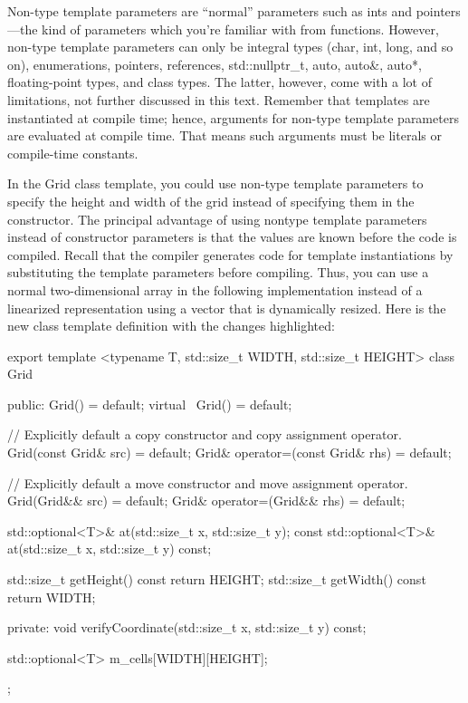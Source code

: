 
Non-type template parameters are “normal” parameters such as ints and pointers—the kind of parameters which you’re familiar with from functions. However, non-type template parameters can only be integral types (char, int, long, and so on), enumerations, pointers, references, std::nullptr\_t, auto, auto\&, auto*, floating-point types, and class types. The latter, however, come with a lot of limitations, not further discussed in this text. Remember that templates are instantiated at compile time; hence, arguments for non-type template parameters are evaluated at compile time. That means such arguments must be literals or compile-time constants.

In the Grid class template, you could use non-type template parameters to specify the height and width of the grid instead of specifying them in the constructor. The principal advantage of using nontype template parameters instead of constructor parameters is that the values are known before the code is compiled. Recall that the compiler generates code for template instantiations by substituting the template parameters before compiling. Thus, you can use a normal two-dimensional array in the following implementation instead of a linearized representation using a vector that is dynamically resized. Here is the new class template definition with the changes highlighted:

\begin{cpp}
export template <typename T, std::size_t WIDTH, std::size_t HEIGHT>
class Grid
{
    public:
        Grid() = default;
        virtual ~Grid() = default;

        // Explicitly default a copy constructor and copy assignment operator.
        Grid(const Grid& src) = default;
        Grid& operator=(const Grid& rhs) = default;

        // Explicitly default a move constructor and move assignment operator.
        Grid(Grid&& src) = default;
        Grid& operator=(Grid&& rhs) = default;

        std::optional<T>& at(std::size_t x, std::size_t y);
        const std::optional<T>& at(std::size_t x, std::size_t y) const;

        std::size_t getHeight() const { return HEIGHT; }
        std::size_t getWidth() const { return WIDTH; }

    private:
        void verifyCoordinate(std::size_t x, std::size_t y) const;

        std::optional<T> m_cells[WIDTH][HEIGHT];
};
\end{cpp}

